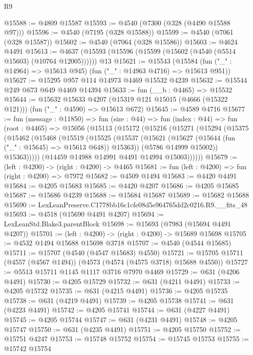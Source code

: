 \begin{lexlean}{R9}
\begin{coremodule}
@15588 := @4809 @15587
@15593 := @4540 (@7300 (@328 (@4490 @15588 @97)))
@15596 := @4540 (@7195 (@328 @15588))
@15599 := @4540 (@7061 (@328 @15587))
@15602 := @4540 (@7064 (@328 @15586))
@15603 := @4624 @4491
@15613 := @4637 (@15593 (@15596 (@15599 (@15602 (@4540 (@5514 @15603) (@10764 @12005)))))) @13
@15621 := @15543
    (@15584 (fun ("_" : @14964) => @15613 @945) (fun ("_" : @14963 @4716) => @15613 @951))
@15627 := @15295 @957 @114 @14973 @4469 @15532 @4239
@15632 := @15544 @249 @673 @649 @4469 @14394
@15633 := fun (__b : @4465) => @15532
@15644 := @15632
    @15633
    @4207
    (@15319 @121 @15015 (@4666 (@15322 @121)))
    (fun ("_" : @4590) => @15613 @672)
@15645 := @4589 @4716
@15677 := fun (message : @11850) =>
  fun (size : @44) =>
  fun (index : @44) =>
  fun (root : @4465) =>
  @15056
    (@15113
      (@15172
        (@15216
          (@15271
            (@15294
              (@15375
                (@15462
                  (@15468
                    (@15519
                      (@15525
                        (@15537
                          (@15621 (@15627 (@15644 (fun ("_" : @15645) => @15613 @648)) @15363))
                          (@5786 @14999 @15002))
                        @15363)))))
              (@14459 @14988 @14991 @4491 @14994 @15003))))))
@15679 := (left : @4200) -> (right : @4200) -> @4465
@15681 := fun (left : @4200) => fun (right : @4200) => @7972
@15682 := @4509 @1494
@15683 := @4420 @4491
@15684 := @4205 @15683
@15685 := @4420 @4207
@15686 := @4205 @15685
@15687 := @15686 @4239
@15688 := @15684 @15687
@15689 := @15682 @15688
@15690 := LexLeanPreserve.C1778bb16c1cfe08d5e964765dd2c0216.R9.__fits_48
@15693 := @4518 (@15690 @4491 @4207)
@15694 := LexLeanStd.Blake3.parentBlock
@15698 := @15693 (@7983 (@15694 @4491 @4207))
@15701 := (left : @4200) -> (right : @4200) -> @15689 @15698
@15705 := @4532 @1494 @15688 @15698 @3718
@15707 := @4540 (@4544 @15685)
@15711 := @15707 (@4540 (@4547 @15683) @4550)
@15721 := @15705 @15711 (@4557 (@4567 @1494)) (@4573 (@4574 (@4575 @3718) @15688 @4550))
@15727 := @5513 @15711 @1145 @1117 @3716 @7970 @4469
@15729 := @631 (@4206 @4491)
@15730 := @4205 @15729
@15732 := @631 (@4211 @4491)
@15733 := @4205 @15732
@15735 := @631 (@4215 @4491)
@15736 := @4205 @15735
@15738 := @631 (@4219 @4491)
@15739 := @4205 @15738
@15741 := @631 (@4223 @4491)
@15742 := @4205 @15741
@15744 := @631 (@4227 @4491)
@15745 := @4205 @15744
@15747 := @631 (@4231 @4491)
@15748 := @4205 @15747
@15750 := @631 (@4235 @4491)
@15751 := @4205 @15750
@15752 := @15751 @4247
@15753 := @15748 @15752
@15754 := @15745 @15753
@15755 := @15742 @15754

\end{coremodule}
\end{lexlean}
